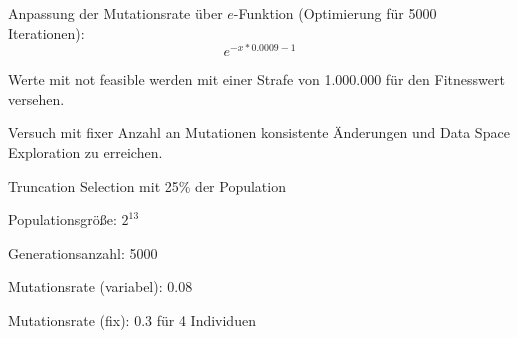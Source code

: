 \documentclass[t,8pt]{beamer}
\begin{document}
\begin{dwFrame}

	\begin{dwItemize}
		\item Anpassung der Mutationsrate über $e$-Funktion (Optimierung für 5000 Iterationen):\\
			\begin{equation*}
				e^{-x*0.0009-1}
			\end{equation*}
		\item Werte mit \glqq  not feasible\grqq{} werden mit einer Strafe von 1.000.000 für den Fitnesswert versehen.
		\item Versuch mit fixer Anzahl an Mutationen konsistente Änderungen und Data Space Exploration zu erreichen.
		\item Truncation Selection mit 25\% der Population
	\end{dwItemize}

	\vspace{2mm}

	\dwHeader{Parameter}

	\begin{dwItemize}
		\item Populationsgröße: $2^{13}$
		\item Generationsanzahl: 5000
		\item Mutationsrate (variabel): 0.08
		\item Mutationsrate (fix): 0.3 für 4 Individuen
	\end{dwItemize}

\end{dwFrame}

\end{document}
